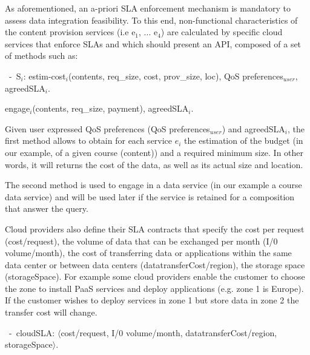 As aforementioned, an a-priori SLA enforcement mechanism is mandatory to assess data integration feasibility.
To this end, non-functional characteristics of the content provision services ({i.e e$_1$, ... e$_4$}) are calculated by specific cloud services that enforce SLAs  and which should present an API, composed of a set of methods such as:

\begin{trivlist}\sf\footnotesize
\item[~-~S$_i$:]estim-cost$_i$(contents, req\_size, cost, prov\_size, loc), QoS preferences$_\mathit{user}$, agreedSLA$_i$.

                engage$_i$(contents, req\_size, payment), agreedSLA$_i$.
\end{trivlist}

 

Given user expressed QoS preferences ({QoS preferences}$_\mathit{user}$) and {agreedSLA}$_i$, the first method allows to obtain for each service $e_i$ the estimation of the budget (in our example, of a given course (content)) and a required minimum size. In other words, it will returns the cost of the data, as well as its actual size and location.
 
 
 The second method is used to engage in a data service (in our example a course data service) and will be used later if the service is retained for a composition that answer the query.
 



Cloud providers also define their SLA contracts that specify the cost per request ({\sf cost/request}), the volume of data that can be exchanged per month ({\sf I/0 volume/month}), the cost of transferring data or applications within the same data center or between data centers ({\sf datatransferCost/region}), the storage space ({\sf storageSpace}). For example some cloud providers enable the customer to choose the zone to install PaaS services and deploy applications (e.g. zone 1 is Europe). If the customer wishes to deploy services in zone 1 but store data in zone 2 the transfer cost will change.

\begin{trivlist}\sf\footnotesize
 \item[~-~cloudSLA:]  $\langle$cost/request, I/0 volume/month, datatransferCost/region, storageSpace$\rangle$.
 \end{trivlist}
 
